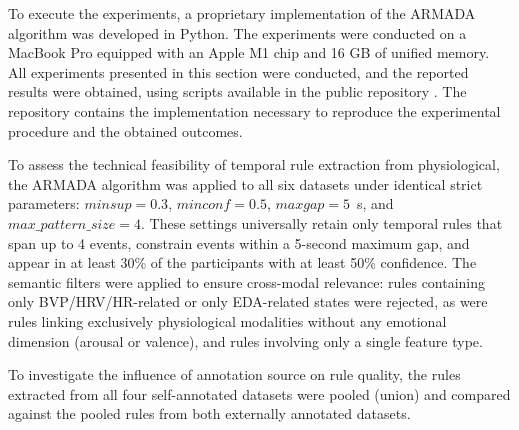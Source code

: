 \documentclass{isd}
\begin{document}
{%

To execute the experiments, a proprietary implementation of the ARMADA algorithm was developed in Python. The experiments were conducted on a MacBook Pro equipped with an Apple M1 chip and 16 GB of unified memory. All experiments presented in this section were conducted, and the reported results were obtained, using scripts available in the public repository \cite{}. The repository contains the implementation necessary to reproduce the experimental procedure and the obtained outcomes.

To assess the technical feasibility of temporal rule extraction from physiological, the ARMADA algorithm was applied to all six datasets under identical strict parameters: $minsup = 0.3$, $minconf = 0.5$, $maxgap = 5$~s, and $max\_pattern\_size = 4$. These settings universally retain only temporal rules that span up to 4 events, constrain events within a 5-second maximum gap, and appear in at least 30\% of the participants with at least 50\% confidence. The semantic filters were applied to ensure cross-modal relevance: rules
containing only BVP/HRV/HR-related or only EDA-related states were rejected, as were rules
linking exclusively physiological modalities without any emotional dimension (arousal or
valence), and rules involving only a single feature type.

To investigate the influence of annotation source on rule quality, the rules extracted from all four self-annotated datasets were pooled (union) and compared against the pooled rules from both externally annotated datasets. %

}
\end{document}
